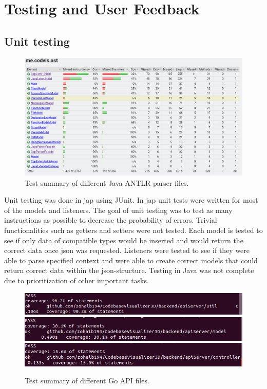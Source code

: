 \chapter{Testing and User Feedback}
\label{chap:testing}

\section{Unit testing}
\begin{figure}[h!] 
    \includegraphics[width=\textwidth]{inc/images/test/JavaTests.png}
    \caption{Test summary of different Java ANTLR  parser files.}
    \label{fig:testJava}
\end{figure}


Unit testing was done in \gls{jap} using JUnit. In \gls{jap} unit tests were written for most of the models and listeners. 
The goal of unit testing was to test as many instructions as possible to decrease the probability of errors. Trivial functionalities such as getters and setters were not tested.
Each model is tested to see if only data of compatible types would be inserted and would return the correct data once \gls{json} was requested. Listeners were tested to see if they were able to parse specified context and were able to create correct models that could return correct data within the \gls{json}-structure. Testing in Java was not complete due to prioritization of other important tasks. 

\begin{figure}[H] 
    \includegraphics[width=\textwidth]{inc/images/test/apiServer_testCoverage_util.png}
    \includegraphics[width=\textwidth]{inc/images/test/apiServer_testCoverage_model.png}
    \includegraphics[width=\textwidth]{inc/images/test/apiServer_testCoverage_controller.png}
    \caption{Test summary of different Go API files.}
    \label{fig:testGO}
\end{figure}

